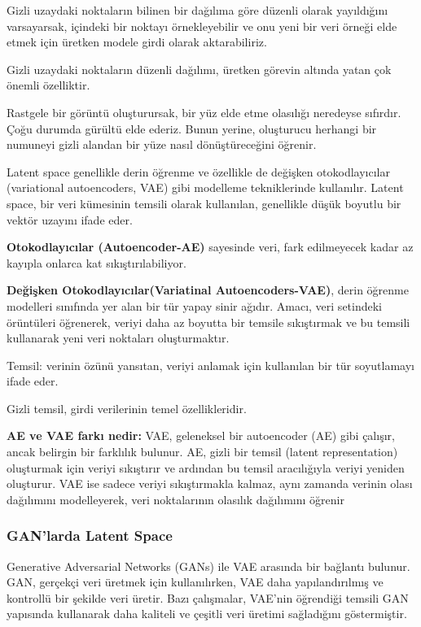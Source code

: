 \documentclass[12pt, a4paper]{article}
\begin{document}
	Gizli uzaydaki noktaların bilinen bir dağılıma göre düzenli olarak yayıldığını varsayarsak, içindeki bir noktayı örnekleyebilir ve onu yeni bir veri örneği elde etmek için üretken modele girdi olarak aktarabiliriz.
	
	Gizli uzaydaki noktaların düzenli dağılımı, üretken görevin altında yatan çok önemli özelliktir. 
	
	Rastgele bir görüntü oluşturursak, bir yüz elde etme olasılığı neredeyse sıfırdır. Çoğu durumda gürültü elde ederiz. Bunun yerine, oluşturucu herhangi bir numuneyi gizli alandan bir yüze nasıl dönüştüreceğini öğrenir.
	
	Latent space genellikle derin öğrenme ve özellikle de değişken otokodlayıcılar (variational autoencoders, VAE) gibi modelleme tekniklerinde kullanılır. Latent space, bir veri kümesinin temsili olarak kullanılan, genellikle düşük boyutlu bir vektör uzayını ifade eder.
	
	\textbf{Otokodlayıcılar (Autoencoder-AE)} sayesinde veri, fark edilmeyecek kadar az kayıpla onlarca kat sıkıştırılabiliyor.
	
	\textbf{Değişken Otokodlayıcılar(Variatinal Autoencoders-VAE)}, derin öğrenme modelleri sınıfında yer alan bir tür yapay sinir ağıdır. Amacı, veri setindeki örüntüleri öğrenerek, veriyi daha az boyutta bir temsile sıkıştırmak ve bu temsili kullanarak yeni veri noktaları oluşturmaktır.
	
	Temsil: verinin özünü yansıtan, veriyi anlamak için kullanılan bir tür soyutlamayı ifade eder.
	
	Gizli temsil, girdi verilerinin temel özellikleridir.
	
	\textbf{AE ve VAE farkı nedir:} VAE, geleneksel bir autoencoder (AE) gibi çalışır, ancak belirgin bir farklılık bulunur. AE, gizli bir temsil (latent representation) oluşturmak için veriyi sıkıştırır ve ardından bu temsil aracılığıyla veriyi yeniden oluşturur. VAE ise sadece veriyi sıkıştırmakla kalmaz, aynı zamanda verinin olası dağılımını modelleyerek, veri noktalarının olasılık dağılımını öğrenir
	
	\subsubsection{GAN'larda Latent Space}
	Generative Adversarial Networks (GANs) ile VAE arasında bir bağlantı bulunur. GAN, gerçekçi veri üretmek için kullanılırken, VAE daha yapılandırılmış ve kontrollü bir şekilde veri üretir. Bazı çalışmalar, VAE’nin öğrendiği temsili GAN yapısında kullanarak daha kaliteli ve çeşitli veri üretimi sağladığını göstermiştir.
	
\end{document}
